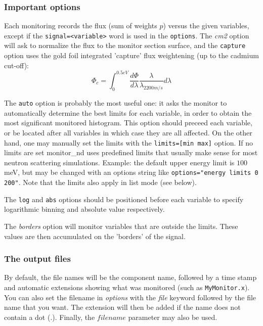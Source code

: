 \subsubsection{Important options}

Each monitoring records the flux (sum of weights $p$) versus the
given variables, except if the \verb+signal=<variable>+ word is used in the \verb+options+.
The \textit{cm2} option will ask to normalize the flux to the monitor section surface, and the \verb+capture+ option uses the gold foil integrated 'capture' flux weightening (up to the cadmium cut-off):
\begin{equation}
\Phi_c = \int_0^{0.5 eV}{\frac{d\Phi}{d\lambda} \frac{\lambda}{\lambda_{2200 m/s}} d\lambda}
\end{equation}

The \verb+auto+ option is probably the most useful one: it asks the monitor to automatically determine the best limits for each variable, in order to obtain the most significant monitored histogram. This option should preceed each variable, or be located after all variables in which case they are all affected.
On the other hand, one may manually set the limits with the \verb+limits=[min max]+ option.
If no limits are set monitor\_nd uses predefined limits that usually make sense for most neutron scattering simulations. Example: the default upper energy limit is $100$ meV, but may be changed with an options string like
\verb+options="energy limits 0 200"+. Note that the limits also apply in list mode (see below).

The \verb+log+ and \verb+abs+ options should be positioned before each variable to specify logarithmic binning and absolute value respectively.

The \textit{borders} option will monitor variables that are outside
the limits. These values are then accumulated on the 'borders' of the
signal.

\subsubsection{The output files}

By default, the file names will be the component name, followed by a time stamp and
automatic extensions showing what was monitored (such as
\texttt{MyMonitor.x}). You can also set the filename in \textit{options}
with the \textit{file} keyword followed by the file name that you want. The
extension will then be added if the name does not contain a dot (.).
Finally, the $filename$ parameter may also be used.

